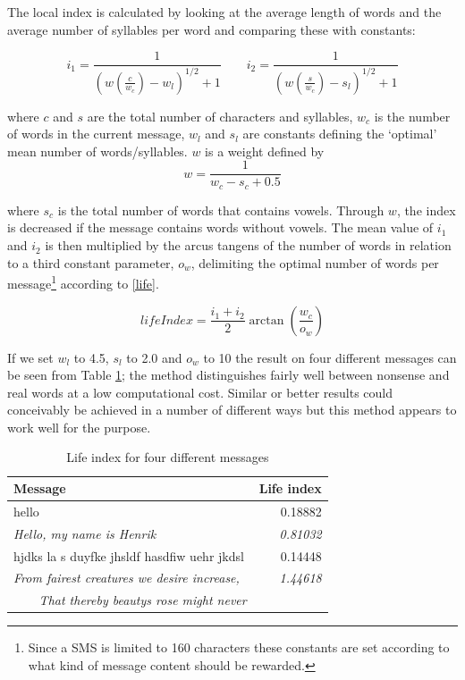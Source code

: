 The local index is calculated by looking at the average length of words and the average number of syllables per word and comparing these with constants: 

\begin{equation}\label{index}
i_1=\frac{1}{(w(\frac{c}{w_c})-w_l)^{1/2}+1} \qquad i_2=\frac{1}{(w(\frac{s}{w_c})-s_l)^{1/2}+1}
\end{equation}

where $c$ and $s$ are the total number of characters and syllables, $w_c$ is the number of words in the current message, $w_l$ and $s_l$ are constants defining the `optimal' mean number of words/syllables. $w$ is a weight defined by 
\begin{equation}
w=\frac{1}{w_c-s_c+0.5}
\end{equation}

where $s_c$ is the total number of words that contains vowels. Through $w$, the index is decreased if the message contains words without vowels. The mean value of $i_1$ and $i_2$ is then multiplied by the arcus tangens of the number of words in relation to a third constant parameter, $o_w$, delimiting the optimal number of words per message\footnote{Since a SMS is limited to 160 characters these   constants are set according to what kind of message content should   be rewarded.} according to \eqref{life}.

\begin{equation} \label{life}
lifeIndex = \frac{i_1+i_2}{2}{\arctan (\frac{w_c}{o_w})}
\end{equation}

If we set $w_l$ to 4.5, $s_l$ to 2.0 and $o_w$ to 10 the result on four different messages can be seen from Table \ref{result}; the method distinguishes fairly well between nonsense and real words at a low computational cost. Similar or better results could conceivably be achieved in a number of different ways but this method appears to work well for the purpose.

  \begin{table}[!tbp]
    \begin{center}
      \begin{tabular}{l|r}
        \hline
        \textbf{Message} & \textbf{Life index} \\
        \hline
        \small{hello} & 0.18882 \\
        \hline
        \small{\textit{Hello, my name is Henrik}} & \textit{0.81032} \\
        \hline
        \small{hjdks la s duyfke jhsldf hasdfiw uehr jkdsl} & 0.14448 \\
        \hline
        \small{\textit{From fairest creatures we desire increase,}} & \textit{1.44618} \\
        \small{\textit{\ \ \ \ That thereby beautys rose might never}} & \\
        \hline
      \end{tabular}
      \caption{Life index for four different messages} \label{result}
    \end{center}
  \end{table}

